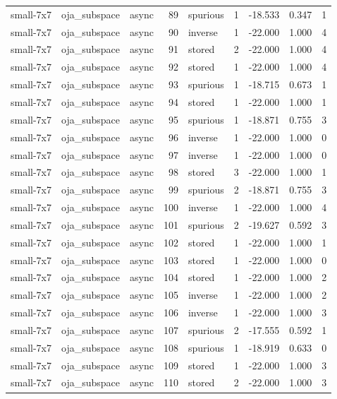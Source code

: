 \begin{tabular}{lllrlrrrr}
small-7x7 & oja\_subspace & async & 89 & spurious & 1 & -18.533 & 0.347 & 1 \\
small-7x7 & oja\_subspace & async & 90 & inverse & 1 & -22.000 & 1.000 & 4 \\
small-7x7 & oja\_subspace & async & 91 & stored & 2 & -22.000 & 1.000 & 4 \\
small-7x7 & oja\_subspace & async & 92 & stored & 1 & -22.000 & 1.000 & 4 \\
small-7x7 & oja\_subspace & async & 93 & spurious & 1 & -18.715 & 0.673 & 1 \\
small-7x7 & oja\_subspace & async & 94 & stored & 1 & -22.000 & 1.000 & 1 \\
small-7x7 & oja\_subspace & async & 95 & spurious & 1 & -18.871 & 0.755 & 3 \\
small-7x7 & oja\_subspace & async & 96 & inverse & 1 & -22.000 & 1.000 & 0 \\
small-7x7 & oja\_subspace & async & 97 & inverse & 1 & -22.000 & 1.000 & 0 \\
small-7x7 & oja\_subspace & async & 98 & stored & 3 & -22.000 & 1.000 & 1 \\
small-7x7 & oja\_subspace & async & 99 & spurious & 2 & -18.871 & 0.755 & 3 \\
small-7x7 & oja\_subspace & async & 100 & inverse & 1 & -22.000 & 1.000 & 4 \\
small-7x7 & oja\_subspace & async & 101 & spurious & 2 & -19.627 & 0.592 & 3 \\
small-7x7 & oja\_subspace & async & 102 & stored & 1 & -22.000 & 1.000 & 1 \\
small-7x7 & oja\_subspace & async & 103 & stored & 1 & -22.000 & 1.000 & 0 \\
small-7x7 & oja\_subspace & async & 104 & stored & 1 & -22.000 & 1.000 & 2 \\
small-7x7 & oja\_subspace & async & 105 & inverse & 1 & -22.000 & 1.000 & 2 \\
small-7x7 & oja\_subspace & async & 106 & inverse & 1 & -22.000 & 1.000 & 3 \\
small-7x7 & oja\_subspace & async & 107 & spurious & 2 & -17.555 & 0.592 & 1 \\
small-7x7 & oja\_subspace & async & 108 & spurious & 1 & -18.919 & 0.633 & 0 \\
small-7x7 & oja\_subspace & async & 109 & stored & 1 & -22.000 & 1.000 & 3 \\
small-7x7 & oja\_subspace & async & 110 & stored & 2 & -22.000 & 1.000 & 3 \\

\end{tabular}
